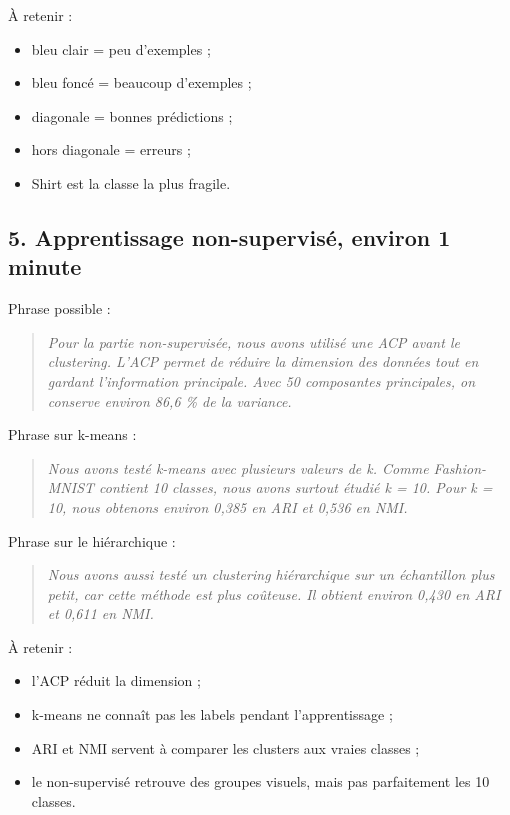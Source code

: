 \documentclass[11pt,a4paper]{article}
\begin{document}
À retenir :

\begin{itemize}
\item bleu clair = peu d'exemples ;
\item bleu foncé = beaucoup d'exemples ;
\item diagonale = bonnes prédictions ;
\item hors diagonale = erreurs ;
\item Shirt est la classe la plus fragile.
\end{itemize}

\subsection{5. Apprentissage non-supervisé, environ 1 minute}

Phrase possible :

\begin{quote}
\itshape Pour la partie non-supervisée, nous avons utilisé une ACP avant le clustering. L'ACP permet de réduire la dimension des données tout en gardant l'information principale. Avec 50 composantes principales, on conserve environ 86,6 \% de la variance.
\end{quote}

Phrase sur k-means :

\begin{quote}
\itshape Nous avons testé k-means avec plusieurs valeurs de k. Comme Fashion-MNIST contient 10 classes, nous avons surtout étudié k = 10. Pour k = 10, nous obtenons environ 0,385 en ARI et 0,536 en NMI.
\end{quote}

Phrase sur le hiérarchique :

\begin{quote}
\itshape Nous avons aussi testé un clustering hiérarchique sur un échantillon plus petit, car cette méthode est plus coûteuse. Il obtient environ 0,430 en ARI et 0,611 en NMI.
\end{quote}

À retenir :

\begin{itemize}
\item l'ACP réduit la dimension ;
\item k-means ne connaît pas les labels pendant l'apprentissage ;
\item ARI et NMI servent à comparer les clusters aux vraies classes ;
\item le non-supervisé retrouve des groupes visuels, mais pas parfaitement les 10 classes.
\end{itemize}
\end{document}
